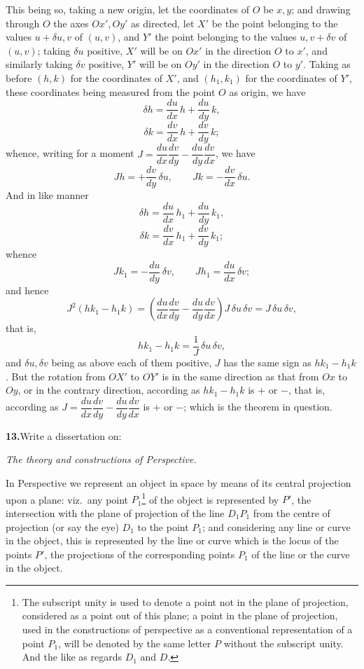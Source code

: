 \documentclass[11pt]{article}
\begin{document}
This being so, taking a new origin, let the coordinates of $O$ be $x,y$; and drawing
through $O$ the axes $Ox',Oy'$ as directed, let $X'$ be the point belonging to the values
$u+\delta u,v$ of $(u,v)$, and $Y'$ the point belonging to the values $u,v+\delta v$ of $(u,v)$;
taking $\delta u$ positive, $X'$ will be on $Ox'$ in the direction $O$ to $x'$, and similarly
taking $\delta v$ positive, $Y'$ will be on $Oy'$ in the direction $O$ to $y'$. Taking as
before $(h,k)$ for the coordinates of $X'$, and $(h_{1},k_{1})$ for the coordinates of $Y'$,
these coordinates being measured from the point $O$ as origin, we have
\[
\delta h=\frac{du}{dx}\,h+\frac{du}{dy}\,k,
\]
\[
\delta k=\frac{dv}{dx}\,h+\frac{dv}{dy}\,k;
\]
whence, writing for a moment $J=\dfrac{du}{dx}\dfrac{dv}{dy}-\dfrac{du}{dy}\dfrac{dv}{dx}$,
we have
\[
Jh=+\frac{dv}{dy}\,\delta u,\qquad Jk=-\frac{dv}{dx}\,\delta u.
\]
And in like manner
\[
\delta h=\frac{du}{dx}\,h_{1}+\frac{du}{dy}\,k_{1},
\]
\[
\delta k=\frac{dv}{dx}\,h_{1}+\frac{dv}{dy}\,k_{1};
\]
whence
\[
Jk_{1}=-\frac{du}{dy}\,\delta v,\qquad Jh_{1}=\frac{du}{dx}\,\delta v;
\]
and hence
\[
J^{2}(hk_{1}-h_{1}k)=\left(\frac{du}{dx}\frac{dv}{dy}-\frac{du}{dy}\frac{dv}{dx}\right)J\,\delta u\,\delta v=J\,\delta u\,\delta v,
\]
that is,
\[
hk_{1}-h_{1}k=\frac{1}{J}\,\delta u\,\delta v,
\]
and $\delta u,\delta v$ being as above each of them positive, $J$ has the same sign as
$hk_{1}-h_{1}k$. But the rotation from $OX'$ to $OY'$ is in the same direction as that
from $Ox$ to $Oy$, or in the contrary direction, according as $hk_{1}-h_{1}k$ is $+$ or $-$,
that is, according as
$J=\dfrac{du}{dx}\dfrac{dv}{dy}-\dfrac{du}{dy}\dfrac{dv}{dx}$ is $+$ or $-$; which is
the theorem in question.

\medskip
\noindent\textbf{13.}\quad Write a dissertation on:

\medskip
\textit{The theory and constructions of Perspective.}

\medskip
In Perspective we represent an object in space by means of its central projection
upon a plane: viz.\ any point $P_{1}$\footnote{The subscript unity is used to denote a
point not in the plane of projection, considered as a point out of this plane; a point
in the plane of projection, used in the constructions of perspective as a conventional
representation of a point $P_{1}$, will be denoted by the same letter $P$ without the
subscript unity. And the like as regards $D_{1}$ and $D$.} of the object is represented
by $P'$, the intersection with the plane of projection of the line $D_{1}P_{1}$ from
the centre of projection (or say the eye) $D_{1}$ to the point $P_{1}$; and considering
any line or curve in the object, this is represented by the line or curve which is
the locus of the points $P'$, the projections of the corresponding points $P_{1}$ of
the line or the curve in the object.
\end{document}
